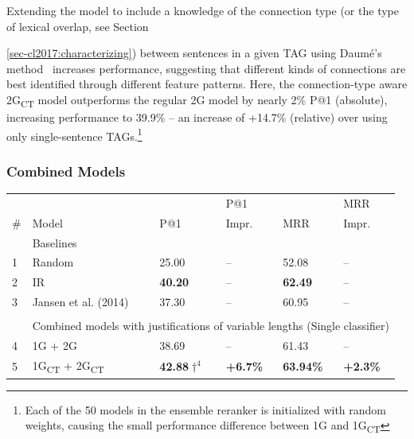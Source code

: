 Extending the model to include a knowledge of the connection type (or the type of lexical overlap, see Section~{\ref{sec-cl2017:characterizing}) between sentences in a given TAG using Daum{\'e}'s method~\citep{daume2007} increases performance, suggesting that different kinds of connections are best identified through different feature patterns.  Here, the connection-type aware 2G\textsubscript{CT} model outperforms the regular 2G model by nearly 2\% P@1 (absolute), increasing performance to 39.9\% -- an increase of +14.7\% (relative) over using only single-sentence TAGs.\footnote{Each of the 50 models in the ensemble reranker is initialized with random weights, causing the small performance difference between 1G and 1G\textsubscript{CT}}





\subsubsection{Combined Models}
\label{sec-cl2017:combinedmodels}
%
%
\begin{table}[t]
    \small
\begin{center}
\begin{tabular}{p{0.3mm}p{55mm}llll}
\multicolumn{1}{l}{ } & \multicolumn{1}{l}{ } & \multicolumn{1}{l}{ } & \multicolumn{1}{l}{P@1} & \multicolumn{1}{l}{ } & \multicolumn{1}{l}{MRR} \\
\multicolumn{1}{l}{\#} & \multicolumn{1}{l}{ Model } & \multicolumn{1}{l}{P@1} & \multicolumn{1}{l}{Impr.} & \multicolumn{1}{l}{MRR} & \multicolumn{1}{l}{Impr.} \\

\hline
& \multicolumn{5}{l}{Baselines }\\
\hline
1 & Random					& 25.00 			& --		& 52.08  		& --	  \\
2 & IR 						& {\bf 40.20} 	& -- 	& {\bf 62.49}	&	--  \\
3 & Jansen et al. (2014)		& 37.30 			& --		& 60.95 			& 	--	 \\

\\
\hline
& \multicolumn{5}{l}{Combined models with justifications of variable lengths (Single classifier)}\\
\hline
4 & 1G + 2G										& 38.69			& --		& 61.43  	& --  \\
5 & 1G\textsubscript{CT} + 2G\textsubscript{CT} 	& {\bf 42.88$\dagger ^4$}	& {\bf +6.7\%}		& {\bf 63.94\%}  	& {\bf +2.3\%}	  \\


\end{tabular}
\end{center}
\end{table}}
